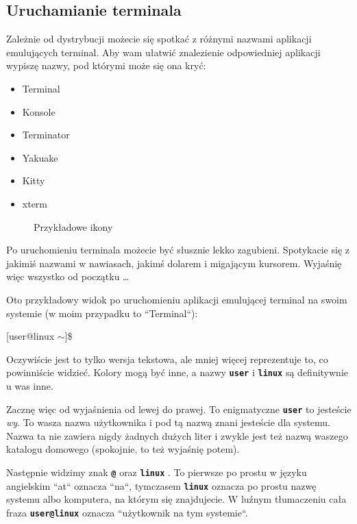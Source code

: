 \documentclass[12pt]{article}
\makeatletter
\newcommand{\ttbf}[1]{
    \texttt{\textbf{#1}}
}
\newenvironment{console1}
{
    \ttfamily
    \fontseries{b}
    \selectfont
    {[}user@linux $\sim${]}\$} {

    }
\makeatother
\begin{document}
\subsection{Uruchamianie terminala}

Zależnie od dystrybucji możecie się spotkać z różnymi nazwami aplikacji emulujących terminal. Aby wam ułatwić znalezienie odpowiedniej aplikacji wypiszę nazwy, pod którymi może się ona kryć:

\begin{itemize}
    \item Terminal
    \item Konsole
    \item Terminator
    \item Yakuake
    \item Kitty
    \item xterm
\end{itemize}

\begin{figure}[H]
    \centering
    \quad
    \subfloat['Konsole']{}
    \caption{Przykładowe ikony}
\end{figure}

Po uruchomieniu terminala możecie być słusznie lekko zagubieni. Spotykacie się z jakimiś nazwami w nawiasach, jakimś dolarem i migającym kursorem. Wyjaśnię więc wszystko od początku \dots

Oto przykładowy widok po uruchomieniu aplikacji emulującej terminal na swoim systemie (w moim przypadku to ``Terminal``):

\begin{console1}

\end{console1}

Oczywiście jest to tylko wersja tekstowa, ale mniej więcej reprezentuje to, co powinniście widzieć. Kolory mogą być inne, a nazwy \ttbf{user} i \ttbf{linux} są definitywnie u was inne.

Zacznę więc od wyjaśnienia od lewej do prawej. To enigmatyczne \ttbf{user} to jesteście \emph{wy}. To wasza nazwa użytkownika i pod tą nazwą znani jesteście dla systemu. Nazwa ta nie zawiera nigdy żadnych dużych liter i zwykle jest też nazwą waszego katalogu domowego (spokojnie, to też wyjaśnię potem).

Następnie widzimy znak \ttbf{@} oraz \ttbf{linux}. To pierwsze po prostu w języku angielskim ``at`` oznacza ``na``, tymczasem \ttbf{linux} oznacza po prostu nazwę systemu albo komputera, na którym się znajdujecie. W luźnym tłumaczeniu cała fraza \ttbf{user@linux} oznacza ``użytkownik na tym systemie``.
\end{document}
